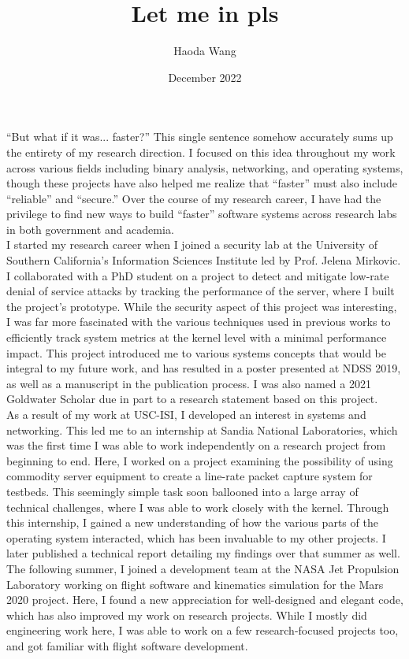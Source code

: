 \documentclass[11pt]{article}
\title{Let me in pls}
\author{Haoda Wang}
\date{December 2022}
\begin{document}
``But what if it was... faster?'' This single sentence somehow accurately sums up the entirety of my research direction. I focused on this idea throughout my work across various fields including binary analysis, networking, and operating systems, though these projects have also helped me realize that ``faster'' must also include ``reliable'' and ``secure.'' Over the course of my research career, I have had the privilege to find new ways to build ``faster'' software systems across research labs in both government and academia.
\\

I started my research career when I joined a security lab at the University of Southern California’s Information Sciences Institute led by Prof. Jelena Mirkovic. I collaborated with a PhD student on a project to detect and mitigate low-rate denial of service attacks by tracking the performance of the server, where I built the project’s prototype. While the security aspect of this project was interesting, I was far more fascinated with the various techniques used in previous works to efficiently track system metrics at the kernel level with a minimal performance impact. This project introduced me to various systems concepts that would be integral to my future work, and has resulted in a poster presented at NDSS 2019, as well as a manuscript in the publication process. I was also named a 2021 Goldwater Scholar due in part to a research statement based on this project.
\\

As a result of my work at USC-ISI, I developed an interest in systems and networking. This led me to an internship at Sandia National Laboratories, which was the first time I was able to work independently on a research project from beginning to end. Here, I worked on a project examining the possibility of using commodity server equipment to create a line-rate packet capture system for testbeds. This seemingly simple task soon ballooned into a large array of technical challenges, where I was able to work closely with the kernel. Through this internship, I gained a new understanding of how the various parts of the operating system interacted, which has been invaluable to my other projects. I later published a technical report detailing my findings over that summer as well.
\\

The following summer, I joined a development team at the NASA Jet Propulsion Laboratory working on flight software and kinematics simulation for the Mars 2020 project. Here, I found a new appreciation for well-designed and elegant code, which has also improved my work on research projects. While I mostly did engineering work here, I was able to work on a few research-focused projects too, and got familiar with flight software development.
\\
\end{document}
